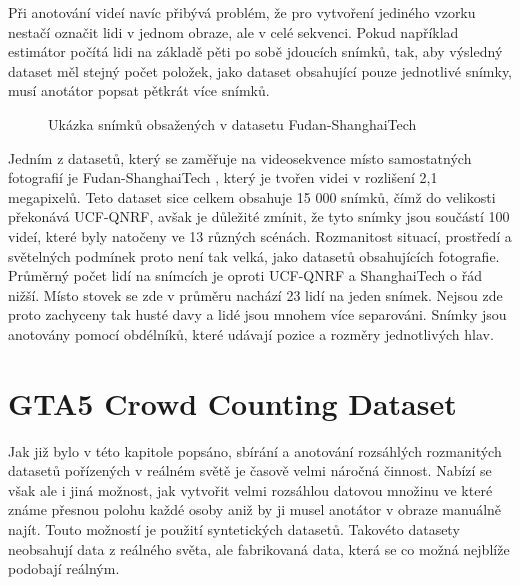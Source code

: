 Při anotování videí navíc přibývá problém, že pro vytvoření jediného vzorku nestačí označit lidi v jednom obraze, ale v celé sekvenci.
Pokud například estimátor počítá lidi na základě pěti po sobě jdoucích snímků, tak, aby výsledný dataset měl stejný počet položek, jako dataset obsahující pouze jednotlivé snímky, musí anotátor popsat pětkrát více snímků.

\begin{figure}[h!]
	\centering
	\caption{Ukázka snímků obsažených v datasetu Fudan-ShanghaiTech \cite{ShanghaiTech}}
	\label{fig:FDST}
\end{figure}


Jedním z datasetů, který se zaměřuje na videosekvence místo samostatných fotografií je Fudan-ShanghaiTech \cite{fdst_dataset}, který je tvořen videi v rozlišení 2,1 megapixelů.
Teto dataset sice celkem obsahuje 15 000 snímků, čímž do velikosti překonává UCF-QNRF, avšak je důležité zmínit, že tyto snímky jsou součástí 100 videí, které byly natočeny ve 13 různých scénách.
Rozmanitost situací, prostředí a světelných podmínek proto není tak velká, jako datasetů obsahujících fotografie.
Průměrný počet lidí na snímcích je oproti UCF-QNRF a ShanghaiTech o řád nižší. Místo stovek se zde v průměru nachází 23 lidí na jeden snímek.
Nejsou zde proto zachyceny tak husté davy a lidé jsou mnohem více separováni.
Snímky jsou anotovány pomocí obdélníků, které udávají pozice a rozměry jednotlivých hlav.

\section{GTA5 Crowd Counting Dataset}
Jak již bylo v této kapitole popsáno, sbírání a anotování rozsáhlých rozmanitých datasetů pořízených v reálném světě je časově velmi náročná činnost.
Nabízí se však ale i jiná možnost, jak vytvořit velmi rozsáhlou datovou množinu ve které známe přesnou polohu každé osoby aniž by ji musel anotátor v obraze manuálně najít.
Touto možností je použití syntetických datasetů.
Takovéto datasety neobsahují data z reálného světa, ale fabrikovaná data, která se co možná nejblíže podobají reálným.

